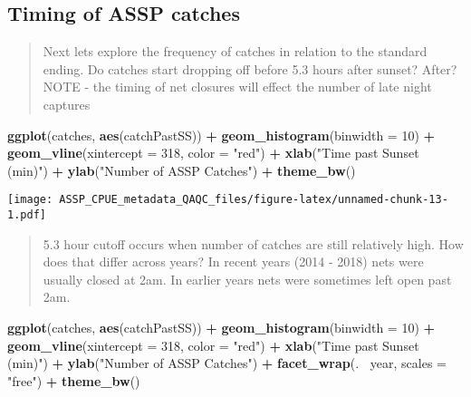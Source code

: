 \documentclass[
]{article}
\newenvironment{Shaded}{\begin{snugshade}}{\end{snugshade}}
\newcommand{\DataTypeTok}[1]{\textcolor[rgb]{0.13,0.29,0.53}{#1}}
\newcommand{\DecValTok}[1]{\textcolor[rgb]{0.00,0.00,0.81}{#1}}
\newcommand{\KeywordTok}[1]{\textcolor[rgb]{0.13,0.29,0.53}{\textbf{#1}}}
\newcommand{\NormalTok}[1]{#1}
\newcommand{\OperatorTok}[1]{\textcolor[rgb]{0.81,0.36,0.00}{\textbf{#1}}}
\newcommand{\StringTok}[1]{\textcolor[rgb]{0.31,0.60,0.02}{#1}}
\begin{document}
\hypertarget{timing-of-assp-catches}{%
\subsection{Timing of ASSP catches}\label{timing-of-assp-catches}}

\begin{quote}
Next lets explore the frequency of catches in relation to the standard
ending. Do catches start dropping off before 5.3 hours after sunset?
After? NOTE - the timing of net closures will effect the number of late
night captures
\end{quote}

\begin{Shaded}
\begin{Highlighting}[]
\KeywordTok{ggplot}\NormalTok{(catches, }\KeywordTok{aes}\NormalTok{(catchPastSS)) }\OperatorTok{+}
\StringTok{  }\KeywordTok{geom_histogram}\NormalTok{(}\DataTypeTok{binwidth =} \DecValTok{10}\NormalTok{) }\OperatorTok{+}
\StringTok{  }\KeywordTok{geom_vline}\NormalTok{(}\DataTypeTok{xintercept =} \DecValTok{318}\NormalTok{, }\DataTypeTok{color =} \StringTok{"red"}\NormalTok{) }\OperatorTok{+}
\StringTok{  }\KeywordTok{xlab}\NormalTok{(}\StringTok{"Time past Sunset (min)"}\NormalTok{) }\OperatorTok{+}\StringTok{ }\KeywordTok{ylab}\NormalTok{(}\StringTok{"Number of ASSP Catches"}\NormalTok{) }\OperatorTok{+}
\StringTok{  }\KeywordTok{theme_bw}\NormalTok{()}
\end{Highlighting}
\end{Shaded}

\texttt{[image: ASSP\_CPUE\_metadata\_QAQC\_files/figure-latex/unnamed-chunk-13-1.pdf]}

\begin{quote}
5.3 hour cutoff occurs when number of catches are still relatively high.
How does that differ across years? In recent years (2014 - 2018) nets
were usually closed at 2am. In earlier years nets were sometimes left
open past 2am.
\end{quote}

\begin{Shaded}
\begin{Highlighting}[]
\KeywordTok{ggplot}\NormalTok{(catches, }\KeywordTok{aes}\NormalTok{(catchPastSS)) }\OperatorTok{+}
\StringTok{  }\KeywordTok{geom_histogram}\NormalTok{(}\DataTypeTok{binwidth =} \DecValTok{10}\NormalTok{) }\OperatorTok{+}
\StringTok{  }\KeywordTok{geom_vline}\NormalTok{(}\DataTypeTok{xintercept =} \DecValTok{318}\NormalTok{, }\DataTypeTok{color =} \StringTok{"red"}\NormalTok{) }\OperatorTok{+}
\StringTok{  }\KeywordTok{xlab}\NormalTok{(}\StringTok{"Time past Sunset (min)"}\NormalTok{) }\OperatorTok{+}\StringTok{ }\KeywordTok{ylab}\NormalTok{(}\StringTok{"Number of ASSP Catches"}\NormalTok{) }\OperatorTok{+}
\StringTok{  }\KeywordTok{facet_wrap}\NormalTok{(.}\OperatorTok{~}\StringTok{ }\NormalTok{year, }\DataTypeTok{scales =} \StringTok{"free"}\NormalTok{) }\OperatorTok{+}
\StringTok{  }\KeywordTok{theme_bw}\NormalTok{()}
\end{Highlighting}
\end{Shaded}
\end{document}
